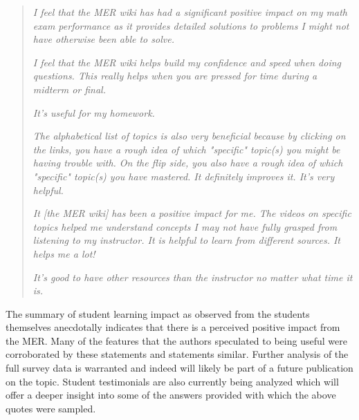 \documentclass{primus}
\begin{document}
\begin{quote}
\textit{I feel that the MER wiki has had a significant positive impact on my math exam performance as it provides detailed solutions to problems I might not have otherwise been able to solve.}

\textit{I feel that the MER wiki helps build my confidence and speed when doing questions. This really helps when you are pressed for time during a midterm or final.}

\textit{It's useful for my homework.}

\textit{The alphabetical list of topics is also very beneficial because by clicking on the links, you have a rough idea of which "specific" topic(s) you might be having trouble with. On the flip side, you also have a rough idea of which "specific" topic(s) you have mastered.  It definitely improves it.  It’s very helpful.}

\textit{It [the MER wiki] has been a positive impact for me. The videos on specific topics helped me understand concepts I may not have fully grasped from listening to my instructor. It is helpful to learn from different sources. It helps me a lot!}

\textit{It's good to have other resources than the instructor no matter what time it is.}
\end{quote}

\noindent{}The summary of student learning impact as observed from the students themselves anecdotally indicates that there is a perceived positive impact from the MER.  Many of the features that the authors speculated to being useful were corroborated by these statements and statements similar.  Further analysis of the full survey data is warranted and indeed will likely be part of a future publication on the topic.  Student testimonials are also currently being analyzed which will offer a deeper insight into some of the answers provided with which the above quotes were sampled.
\end{document}
